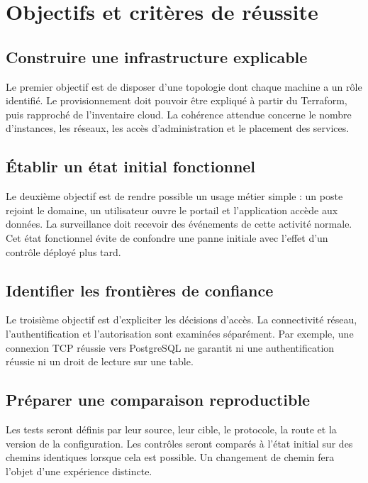 \documentclass[a4paper,12pt]{report}
\begin{document}
\section{Objectifs et critères de réussite}
\subsection{Construire une infrastructure explicable}
Le premier objectif est de disposer d'une topologie dont chaque machine a un rôle identifié. Le provisionnement doit pouvoir être expliqué à partir du Terraform, puis rapproché de l'inventaire cloud. La cohérence attendue concerne le nombre d'instances, les réseaux, les accès d'administration et le placement des services.

\subsection{Établir un état initial fonctionnel}
Le deuxième objectif est de rendre possible un usage métier simple : un poste rejoint le domaine, un utilisateur ouvre le portail et l'application accède aux données. La surveillance doit recevoir des événements de cette activité normale. Cet état fonctionnel évite de confondre une panne initiale avec l'effet d'un contrôle déployé plus tard.

\subsection{Identifier les frontières de confiance}
Le troisième objectif est d'expliciter les décisions d'accès. La connectivité réseau, l'authentification et l'autorisation sont examinées séparément. Par exemple, une connexion TCP réussie vers PostgreSQL ne garantit ni une authentification réussie ni un droit de lecture sur une table.

\subsection{Préparer une comparaison reproductible}
Les tests seront définis par leur source, leur cible, le protocole, la route et la version de la configuration. Les contrôles seront comparés à l'état initial sur des chemins identiques lorsque cela est possible. Un changement de chemin fera l'objet d'une expérience distincte.
\end{document}

